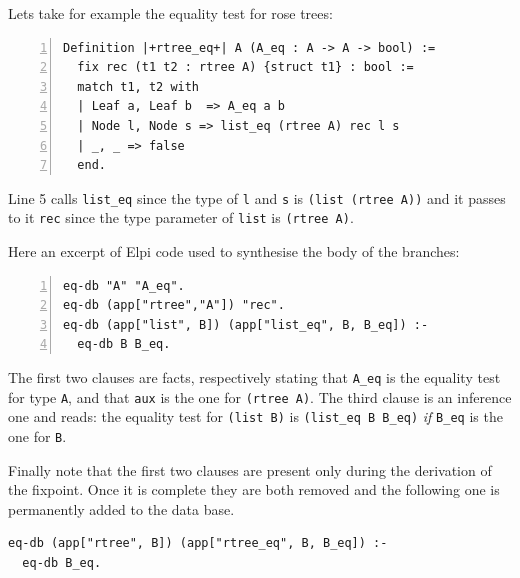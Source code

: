 \documentclass[sigplan,10pt,review]{acmart}\settopmatter{printfolios=true,printccs=false,printacmref=false}
\begin{document}
Lets take for example the equality test for rose trees:

\begin{minipage}{\textwidth}\begin{lstlisting}[numbers=left]
Definition |+rtree_eq+| A (A_eq : A -> A -> bool) :=
  fix rec (t1 t2 : rtree A) {struct t1} : bool :=
  match t1, t2 with
  | Leaf a, Leaf b  => A_eq a b
  | Node l, Node s => list_eq (rtree A) rec l s
  | _, _ => false
  end.
\end{lstlisting}\end{minipage}

\noindent
Line 5 calls \lstinline+list_eq+ since the type of \lstinline+l+ and
\lstinline+s+ is \lstinline+(list (rtree A))+ and it passes to it
\lstinline+rec+ since the type parameter of \lstinline+list+ is
\lstinline+(rtree A)+.

Here an excerpt of Elpi code used to synthesise the body of the
branches:

\begin{minipage}{\textwidth}\begin{lstlisting}[numbers=left]
eq-db "A" "A_eq".
eq-db (app["rtree","A"]) "rec".
eq-db (app["list", B]) (app["list_eq", B, B_eq]) :-
  eq-db B B_eq.
\end{lstlisting}\end{minipage}

\noindent
The first two clauses are facts, respectively stating that
\lstinline+A_eq+ is the equality test for type
\lstinline+A+, and that \lstinline+aux+ is the one for
\lstinline+(rtree A)+. 
The third clause is an inference one and reads: the equality test
for \lstinline+(list B)+ is \lstinline+(list_eq B B_eq)+ \emph{if}
\lstinline+B_eq+ is the one for \lstinline+B+.

Finally note that the first two clauses are present only during the
derivation of the fixpoint. 
Once it is complete they are both removed and the
following one is permanently added to the data base.

\begin{minipage}{\textwidth}\begin{lstlisting}[]
eq-db (app["rtree", B]) (app["rtree_eq", B, B_eq]) :-
  eq-db B_eq.
\end{lstlisting}\end{minipage}


% 
% 
\end{document}
